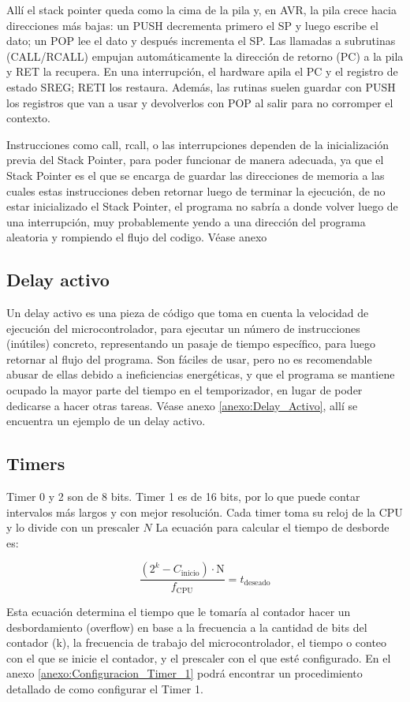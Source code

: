 Allí el stack pointer queda como la cima de la pila y, en AVR, la pila crece hacia direcciones más bajas: un PUSH decrementa primero el SP y luego escribe el dato; un POP lee el dato y después incrementa el SP. Las llamadas a subrutinas (CALL/RCALL) empujan automáticamente la dirección de retorno (PC) a la pila y RET la recupera. En una interrupción, el hardware apila el PC y el registro de estado SREG; RETI los restaura. Además, las rutinas suelen guardar con PUSH los registros que van a usar y devolverlos con POP al salir para no corromper el contexto.

Instrucciones como call, rcall, o las interrupciones dependen de la inicialización previa del Stack Pointer, para poder funcionar de manera adecuada, ya que el Stack Pointer es el que se encarga de guardar las direcciones de memoria a las cuales estas instrucciones deben retornar luego de terminar la ejecución, de no estar inicializado el Stack Pointer, el programa no sabría a donde volver luego de una interrupción, muy probablemente yendo a una dirección del programa aleatoria y rompiendo el flujo del codigo. Véase anexo 

\subsection{Delay activo}
Un delay activo es una pieza de código que toma en cuenta la velocidad de ejecución del microcontrolador, para ejecutar un número de instrucciones (inútiles) concreto, representando un pasaje de tiempo específico, para luego retornar al flujo del programa. Son fáciles de usar, pero no es recomendable abusar de ellas debido a ineficiencias energéticas, y que el programa se mantiene ocupado la mayor parte del tiempo en el temporizador, en lugar de poder dedicarse a hacer otras tareas. Véase anexo \ref{anexo:Delay_Activo}, allí se encuentra un ejemplo de un delay activo.

\subsection{Timers}
Timer 0 y 2 son de 8 bits. Timer 1 es de 16 bits, por lo que puede contar intervalos más largos y con mejor resolución. Cada timer toma su reloj de la CPU y lo divide con un prescaler \(N\) La ecuación para calcular el tiempo de desborde es:

\[
    \frac{(2^{k} - C_{\text{inicio}})\cdot \text{N}}{f_{\text{CPU}}} = t_{\text{deseado}}
\]


Esta ecuación determina el tiempo que le tomaría al contador hacer un desbordamiento (overflow) en base a la frecuencia a la cantidad de bits del contador (k), la frecuencia de trabajo del microcontrolador, el tiempo o conteo con el que se inicie el contador, y el prescaler con el que esté configurado. En el anexo \ref{anexo:Configuracion_Timer_1} podrá encontrar un procedimiento detallado de como configurar el Timer 1.

